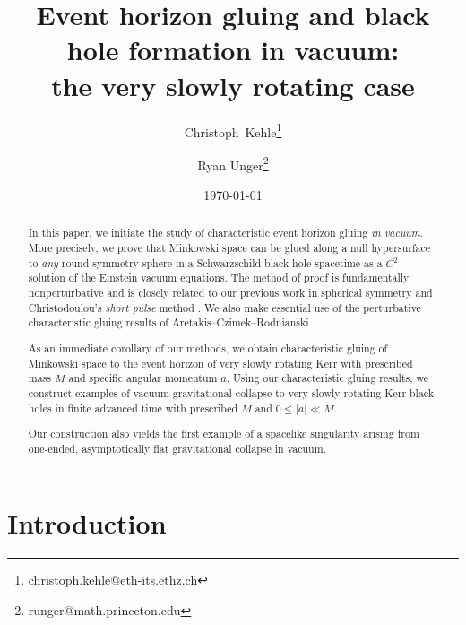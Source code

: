 \documentclass[10pt]{article}
\numberwithin{equation}{section}
\theoremstyle{plain}
\theoremstyle{definition}
\begin{document}
\title{Event horizon gluing and black hole formation in vacuum: \\ the very slowly rotating case}


\author[1]{Christoph~Kehle\thanks{christoph.kehle@eth-its.ethz.ch}}
\author[2]{Ryan Unger\thanks{runger@math.princeton.edu}}

 \date{\today}
\maketitle

\begin{abstract} In this paper, we initiate the study of characteristic event horizon gluing \emph{in vacuum}. More precisely, we prove that Minkowski space can be glued along a null hypersurface to \emph{any} round symmetry sphere in a Schwarzschild black hole  spacetime as a $C^2$ solution of the Einstein vacuum equations. The method of proof is fundamentally nonperturbative and is closely related to our previous work in spherical symmetry \cite{KU22} and Christodoulou's \emph{short pulse} method \cite{Christo09}. We also make essential use of the perturbative characteristic gluing results of Aretakis--Czimek--Rodnianski \cite{ACR1, Czimek2022-cl}.

 As an immediate corollary of our methods, we obtain characteristic gluing of Minkowski space to the event horizon of very slowly rotating Kerr with prescribed mass $M$ and specific angular momentum $a$.  Using our characteristic gluing results, we construct examples of vacuum gravitational collapse to very slowly rotating Kerr black holes in finite advanced time with prescribed $M$ and $0\le |a|\ll M$. 

 Our construction also yields the first example of a spacelike singularity arising from one-ended, asymptotically flat gravitational collapse in vacuum. 
\end{abstract}

\tableofcontents

\section{Introduction} \label{sec:introduction}
\end{document}
